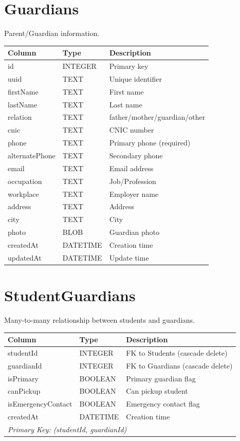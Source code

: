 \documentclass[12pt,a4paper]{report}
\begin{document}
\section{Guardians}

Parent/Guardian information.

\begin{longtable}{@{}p{4cm}p{2.5cm}p{6.5cm}@{}}
\toprule
\textbf{Column} & \textbf{Type} & \textbf{Description} \\
\midrule
\endhead
id & INTEGER & Primary key \\
uuid & TEXT & Unique identifier \\
firstName & TEXT & First name \\
lastName & TEXT & Last name \\
relation & TEXT & father/mother/guardian/other \\
cnic & TEXT & CNIC number \\
phone & TEXT & Primary phone (required) \\
alternatePhone & TEXT & Secondary phone \\
email & TEXT & Email address \\
occupation & TEXT & Job/Profession \\
workplace & TEXT & Employer name \\
address & TEXT & Address \\
city & TEXT & City \\
photo & BLOB & Guardian photo \\
createdAt & DATETIME & Creation time \\
updatedAt & DATETIME & Update time \\
\bottomrule
\end{longtable}

\section{StudentGuardians}

Many-to-many relationship between students and guardians.

\begin{longtable}{@{}p{4cm}p{2.5cm}p{6.5cm}@{}}
\toprule
\textbf{Column} & \textbf{Type} & \textbf{Description} \\
\midrule
\endhead
studentId & INTEGER & FK to Students (cascade delete) \\
guardianId & INTEGER & FK to Guardians (cascade delete) \\
isPrimary & BOOLEAN & Primary guardian flag \\
canPickup & BOOLEAN & Can pickup student \\
isEmergencyContact & BOOLEAN & Emergency contact flag \\
createdAt & DATETIME & Creation time \\
\multicolumn{3}{l}{\textit{Primary Key: (studentId, guardianId)}} \\
\bottomrule
\end{longtable}
\end{document}
